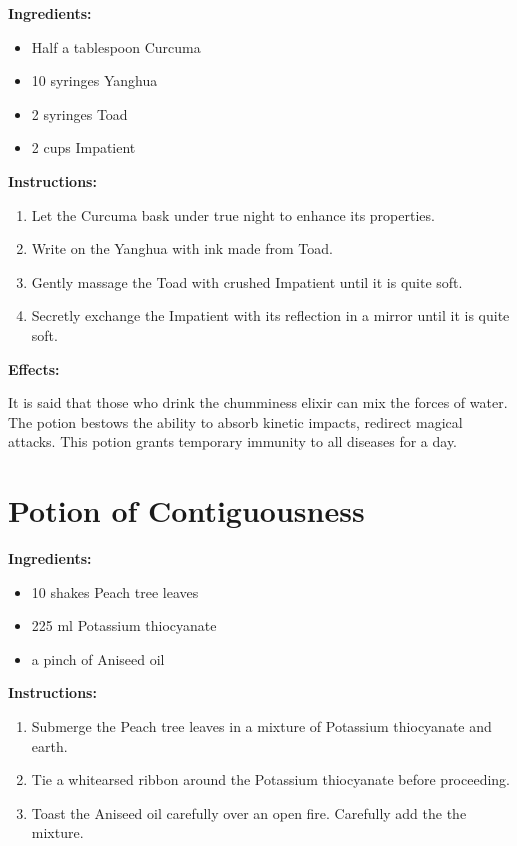 \documentclass{article}
\begin{document}
\textbf{Ingredients:}

\begin{itemize}
  \item Half a tablespoon Curcuma
  \item 10 syringes Yanghua
  \item 2 syringes Toad
  \item 2 cups Impatient
\end{itemize}

\textbf{Instructions:}

\begin{enumerate}
  \item Let the Curcuma bask under true night to enhance its properties.
  \item Write on the Yanghua with ink made from Toad.
  \item Gently massage the Toad with crushed Impatient until it is quite soft.
  \item Secretly exchange the Impatient with its reflection in a mirror until it is quite soft.
\end{enumerate}

\textbf{Effects:}

It is said that those who drink the chumminess elixir can mix the forces of water. The potion bestows the ability to absorb kinetic impacts, redirect magical attacks. This potion grants temporary immunity to all diseases for a day.

\newpage
\section*{Potion of Contiguousness}

\textbf{Ingredients:}

\begin{itemize}
  \item 10 shakes Peach tree leaves
  \item 225 ml Potassium thiocyanate
  \item a pinch of Aniseed oil
\end{itemize}

\textbf{Instructions:}

\begin{enumerate}
  \item Submerge the Peach tree leaves in a mixture of Potassium thiocyanate and earth.
  \item Tie a whitearsed ribbon around the Potassium thiocyanate before proceeding.
  \item Toast the Aniseed oil carefully over an open fire. Carefully add the the mixture.
\end{enumerate}
\end{document}
